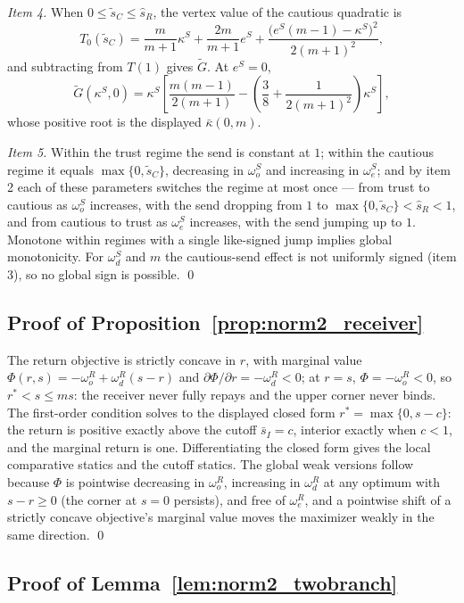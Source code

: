 \documentclass[11pt]{article}
\theoremstyle{plain}
\theoremstyle{remark}
\begin{document}
\emph{Item 4.}  When $0\le\tilde s_C\le\hat s_R$, the vertex value of the cautious quadratic is
\[
        T_0(\tilde s_C)=\frac{m}{m+1}\kappa^S+\frac{2m}{m+1}e^S+\frac{\big(e^S(m-1)-\kappa^S\big)^2}{2(m+1)^2},
\]
and subtracting from $T(1)$ gives $\tilde G$.  At $e^S=0$,
\[
        \tilde G(\kappa^S,0)=\kappa^S\left[\frac{m(m-1)}{2(m+1)}-\left(\frac38+\frac1{2(m+1)^2}\right)\kappa^S\right],
\]
whose positive root is the displayed $\bar\kappa(0,m)$.

\emph{Item 5.}  Within the trust regime the send is constant at $1$; within the cautious regime it equals $\max\{0,\tilde s_C\}$, decreasing in $\omega_o^S$ and increasing in $\omega_e^S$; and by item 2 each of these parameters switches the regime at most once --- from trust to cautious as $\omega_o^S$ increases, with the send dropping from $1$ to $\max\{0,\tilde s_C\}<\hat s_R<1$, and from cautious to trust as $\omega_e^S$ increases, with the send jumping up to $1$.  Monotone within regimes with a single like-signed jump implies global monotonicity.  For $\omega_d^S$ and $m$ the cautious-send effect is not uniformly signed (item 3), so no global sign is possible.
\qed

\subsection*{Proof of Proposition~\ref{prop:norm2_receiver}}

The return objective is strictly concave in $r$, with marginal value $\Phi(r,s)=-\omega_o^{R}+\omega_d^{R}(s-r)$ and $\partial\Phi/\partial r=-\omega_d^{R}<0$; at $r=s$, $\Phi=-\omega_o^{R}<0$, so $r^\ast<s\le ms$: the receiver never fully repays and the upper corner never binds.  The first-order condition solves to the displayed closed form $r^\ast=\max\{0,s-c\}$: the return is positive exactly above the cutoff $\bar s_I=c$, interior exactly when $c<1$, and the marginal return is one.  Differentiating the closed form gives the local comparative statics and the cutoff statics.  The global weak versions follow because $\Phi$ is pointwise decreasing in $\omega_o^{R}$, increasing in $\omega_d^{R}$ at any optimum with $s-r\ge0$ (the corner at $s=0$ persists), and free of $\omega_e^{R}$, and a pointwise shift of a strictly concave objective's marginal value moves the maximizer weakly in the same direction.
\qed

\subsection*{Proof of Lemma~\ref{lem:norm2_twobranch}}
\end{document}
